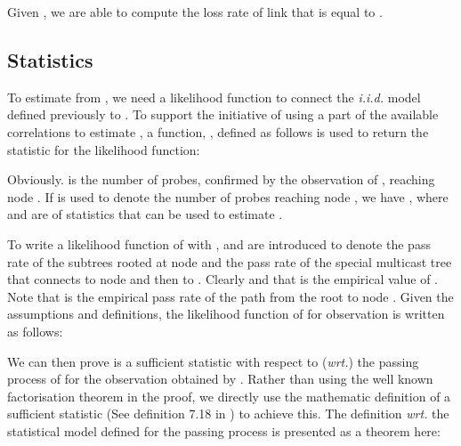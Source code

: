 \documentclass[10pt,onecolumn]{IEEEtran}
\begin{document}
Given , we are able to compute the loss rate of link  that is equal to .


\subsection{Statistics}

\label{mlesection}

To estimate   from , we need a likelihood function to connect the {\it i.i.d.} model defined previously to . To support the initiative of using a part of the available correlations to estimate , a function, , defined as follows is used to return the statistic for the likelihood function:
 
Obviously.
 \noindent   is the number of probes, confirmed by the observation of , reaching node . If  is used to denote the number of probes reaching node , we have , where  and  are of statistics that can be used to estimate .

 To write a likelihood function of  with ,  and  are introduced to denote the pass rate of the subtrees rooted at node  and the pass rate of the special multicast tree that connects  to node  and then to . Clearly  and  that is the empirical value of . Note that  is the empirical pass rate of the path from the root to node .
Given the assumptions and definitions,  the likelihood function of  for observation  is written as follows:

We can then prove   is a sufficient statistic with respect to ({\it wrt.}) the passing process of  for the observation obtained by . Rather than using the well known factorisation theorem in the proof, we directly use the mathematic definition of a sufficient statistic (See definition 7.18 in \cite{RM96}) to achieve this. The definition {\it wrt.} the statistical model defined for the passing process is presented as a theorem here:
\end{document}
